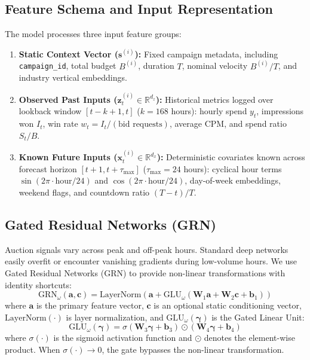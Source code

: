 \documentclass[sigconf]{acmart}
\begin{document}
\subsection{Feature Schema and Input Representation}
The model processes three input feature groups:
\begin{enumerate}
    \item \textbf{Static Context Vector ($\mathbf{s}^{(i)}$):} Fixed campaign metadata, including \texttt{campaign\_id}, total budget $B^{(i)}$, duration $T$, nominal velocity $B^{(i)}/T$, and industry vertical embeddings.
    \item \textbf{Observed Past Inputs ($\mathbf{z}_t^{(i)} \in \mathbb{R}^{d_z}$):} Historical metrics logged over lookback window $[t-k+1, t]$ ($k=168$ hours): hourly spend $y_t$, impressions won $I_t$, win rate $w_t = I_t / (\text{bid requests})$, average CPM, and spend ratio $S_t / B$.
    \item \textbf{Known Future Inputs ($\mathbf{x}_t^{(i)} \in \mathbb{R}^{d_x}$):} Deterministic covariates known across forecast horizon $[t+1, t+\tau_{\max}]$ ($\tau_{\max}=24$ hours): cyclical hour terms $\sin(2\pi \cdot \text{hour}/24)$ and $\cos(2\pi \cdot \text{hour}/24)$, day-of-week embeddings, weekend flags, and countdown ratio $(T - t)/T$.
\end{enumerate}

\subsection{Gated Residual Networks (GRN)}
Auction signals vary across peak and off-peak hours. Standard deep networks easily overfit or encounter vanishing gradients during low-volume hours. We use Gated Residual Networks (GRN) to provide non-linear transformations with identity shortcuts:
\begin{equation}
    \mathrm{GRN}_\omega(\mathbf{a}, \mathbf{c}) = \mathrm{LayerNorm}\left(\mathbf{a} + \mathrm{GLU}_\omega\left(\mathbf{W}_{1}\mathbf{a} + \mathbf{W}_{2}\mathbf{c} + \mathbf{b}_{1}\right)\right)
\end{equation}
where $\mathbf{a}$ is the primary feature vector, $\mathbf{c}$ is an optional static conditioning vector, $\mathrm{LayerNorm}(\cdot)$ is layer normalization, and $\mathrm{GLU}_\omega(\boldsymbol{\gamma})$ is the Gated Linear Unit:
\begin{equation}
    \mathrm{GLU}_\omega(\boldsymbol{\gamma}) = \sigma\left(\mathbf{W}_3 \boldsymbol{\gamma} + \mathbf{b}_3\right) \odot \left(\mathbf{W}_4 \boldsymbol{\gamma} + \mathbf{b}_4\right)
\end{equation}
where $\sigma(\cdot)$ is the sigmoid activation function and $\odot$ denotes the element-wise product. When $\sigma(\cdot) \to 0$, the gate bypasses the non-linear transformation.
\end{document}
